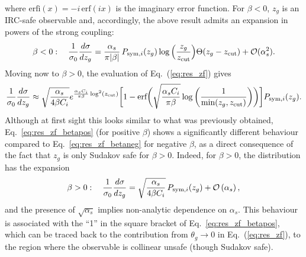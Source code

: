 where $\text{erfi}(x)=-i\, \text{erf}(ix)$ is the imaginary error
function.
%
For $\beta<0$, $z_g$ is an IRC-safe observable and, accordingly, the
above result admits an expansion in powers of the strong coupling:
\begin{equation}
\beta < 0: \quad \frac{1}{\sigma_0}\frac{d \sigma}{d z_g}  = \frac{\alpha_s}{\pi |\beta| } \, P_{\text{sym},i}(z_g) \log\Big(\frac{z_g}{z_\text{cut}}\Big) \Theta(z_g -z_{\text{cut}})+{\cal O}(\alpha_s^2).
\end{equation}
%
Moving now to $\beta>0$, the evaluation of Eq.~(\ref{eq:res_zf}) gives
\begin{equation} \label{eq:res_zf_betapos}
  \frac{1}{\sigma_0}\frac{d \sigma}{d z_g}
  \approx\sqrt{\frac{\alpha_s}{4\beta C_i}}
    e^{{\frac{\alpha_s C_i}{\pi \beta}\log^2 (z_\text{cut})}}
    \bigg[ 1 - \text{erf} \bigg( \sqrt{\frac{\alpha_s C_i}{\pi\beta} }
               \log\bigg(\frac{1}{\text{min}(z_g,z_{\text{cut}})}\bigg)\bigg) \bigg]
    P_{\text{sym},i}(z_g).
\end{equation}
Although at first sight this looks similar to what was previously obtained, 
Eq.~\eqref{eq:res_zf_betapos} (for positive $\beta$)
shows a significantly different behaviour compared to
Eq.~\eqref{eq:res_zf_betaneg} for negative $\beta$, as a direct consequence
of the fact that $z_g$ is only Sudakov safe for $\beta>0$.
%
Indeed, for $\beta > 0$, the distribution has the expansion
\begin{equation}
\beta > 0: \quad \frac{1}{\sigma_0}\frac{d \sigma}{d z_g}  =
\sqrt{\frac{\alpha_s}{4 \beta C_i}}\, P_{\text{sym},i}(z_g)+{\cal O}\left(\alpha_s\right) , 
\end{equation}
and the presence of $\sqrt{\alpha_s}$ implies non-analytic dependence
on $\alpha_s$.
%
This behaviour is associated with the ``1'' in the square bracket
of Eq.~\eqref{eq:res_zf_betapos}, which can be traced back to the
contribution from $\theta_g\to 0$ in Eq.~(\ref{eq:res_zf}), \ie to the
region where the observable is collinear unsafe (though Sudakov safe).

